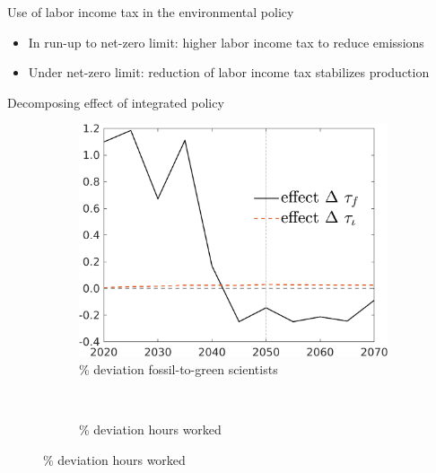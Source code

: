 \documentclass[11pt,aspectratio=169]{beamer}
\begin{document}
\begin{frame}{Use of labor income tax in the environmental policy}
\begin{figure}[h!!]
\begin{subfigure}{0.45\textwidth}
		\end{subfigure}
	\end{figure}
	\vspace{3mm}
	\begin{block}{}
		\begin{itemize}
			\item In run-up to net-zero limit: higher labor income tax to reduce emissions
			\item Under net-zero limit: reduction of labor income tax stabilizes production
		\end{itemize}
	\end{block}	
\end{frame}

\begin{frame}{Decomposing effect of integrated policy }
	\pause
	\hypertarget{mec0}{}
	\vspace{-3mm}
	\centering
	\begin{figure}
		\begin{subfigure}{0.45\textwidth}
			\caption{{\% deviation fossil-to-green scientists }}
			\includegraphics[width=1\textwidth]{../codding_model/own_basedOnFried/optimalPol_010922_revision/figures/all_13Sept22/NewCalib_polTaulFixedTaufJointPer_sffsg_Sun2_emnet1_spillover0_knspil3_xgr0_nsk0_sep0_extern0_PV1_etaa0.79_lgd1.png}
		\end{subfigure}
		\begin{minipage}[]{0.05\textwidth}
			\
		\end{minipage}
		\begin{subfigure}{0.45\textwidth}
			\caption{{\% deviation hours worked }}

\end{subfigure}
\end{figure}
\end{frame}
\end{document}
